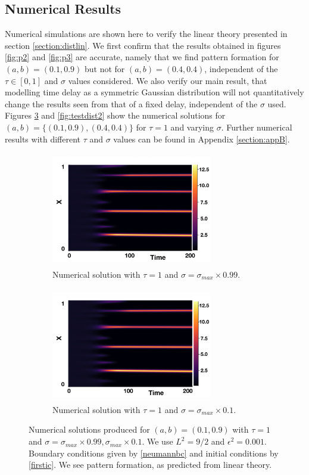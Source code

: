 \subsection{Numerical Results}\label{section:distsim}
Numerical simulations are shown here to verify the linear theory presented in section \ref{section:distlin}. We first confirm that the results obtained in figures \ref{fig:p2} and \ref{fig:p3} are accurate, namely that we find pattern formation for $(a,b)=(0.1,0.9)$ but not for $(a,b)=(0.4,0.4)$, independent of the $\tau\in[0,1]$ and $\sigma$ values considered. We also verify our main result, that modelling time delay as a symmetric Gaussian distribution will not quantitatively change the results seen from that of a fixed delay, independent of the $\sigma$ used. Figures \ref{fig:testdist1} and \ref{fig:testdist2} show the numerical solutions for $(a,b)=\{(0.1,0.9),(0.4,0.4)\}$ for $\tau=1$ and varying $\sigma$. Further numerical results with different $\tau$ and $\sigma$ values can be found in Appendix \ref{section:appB}.

\begin{figure}[H]
    \centering
    \begin{subfigure}[t]{0.45\textwidth}
        \centering
        \includegraphics[width=7cm,height=5cm]{distp1sig1.png}
        \caption{Numerical solution with $\tau=1$ and $\sigma=\sigma_{max}\times0.99$.}
        \label{}
    \end{subfigure}
    \hfill
    \begin{subfigure}[t]{0.45\textwidth}
        \centering
        \includegraphics[width=7cm,height=5cm]{distp1sig2.png}
        \caption{Numerical solution with $\tau=1$ and $\sigma=\sigma_{max}\times0.1$.}
        \label{}
    \end{subfigure}
    \caption{Numerical solutions produced for $(a,b)=(0.1,0.9)$ with $\tau=1$ and $\sigma=\sigma_{max}\times0.99, \sigma_{max}\times0.1$. We use $L^2=9/2$ and $\epsilon^2=0.001$.
    Boundary conditions given by \eqref{neumannbc} and initial conditions by \eqref{firstic}. We see pattern formation, as predicted from linear theory.}
    \label{fig:testdist1}
\end{figure}

